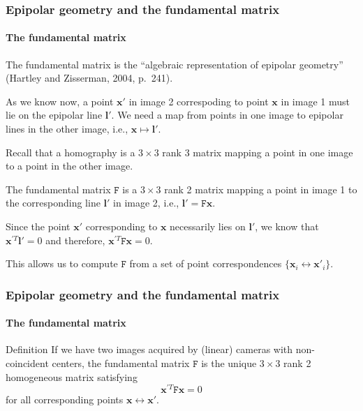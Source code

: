 \documentclass[aspectratio=169]{beamer}
\renewcommand{\vec}[1]{\boldsymbol{#1}}
\newcommand{\mat}[1]{\mathtt{#1}}
\begin{document}
\begin{frame}
\frametitle{Epipolar geometry and the fundamental matrix}
\framesubtitle{The fundamental matrix}

The fundamental matrix is the ``algebraic representation of epipolar
geometry'' (Hartley and Zisserman, 2004, p.\ 241).

\medskip

As we know now, a point $\vec{x}'$ in image 2 correspoding to point
$\vec{x}$ in image 1 must lie on the epipolar line $\vec{l}'$.  We
need a \alert{map} from \alert{points} in one image to \alert{epipolar
lines} in the other image, i.e., $\vec{x} \mapsto \vec{l}'$.

\medskip

Recall that a \alert{homography} is a $3\times 3$ rank 3 matrix
mapping a point in one image to a point in the other image.

\medskip

The \alert{fundamental matrix} $\mat{F}$ is a $3\times 3$
\alert{rank 2} matrix mapping a point in image 1 to the corresponding
line $\vec{l}'$ in image 2, i.e., $\vec{l}' = \mat{F}\vec{x}$.

\medskip

Since the point $\vec{x}'$ corresponding to $\vec{x}$ necessarily lies
on $\vec{l}'$, we know that $\vec{x}^{\prime T}\vec{l}'=0$ and
therefore, $\vec{x}^{\prime T}\mat{F}\vec{x}=0$.

\medskip

This allows us to compute $\mat{F}$ from a set of \alert{point
correspondences} $\{ \vec{x}_i \leftrightarrow \vec{x}'_i\}$.

\end{frame}

\begin{frame}
\frametitle{Epipolar geometry and the fundamental matrix}
\framesubtitle{The fundamental matrix}

\begin{block}{Definition}
If we have two images acquired by (linear) cameras with non-coincident
centers, the \alert{fundamental matrix} $\mat{F}$ is the unique
$3\times 3$ rank 2 homogeneous matrix satisfying
\begin{equation*}
\vec{x}^{\prime T}\mat{F}\vec{x}=0
\end{equation*}
for all corresponding points $\vec{x} \leftrightarrow \vec{x}'$.
\end{block}

\end{frame}
\end{document}
